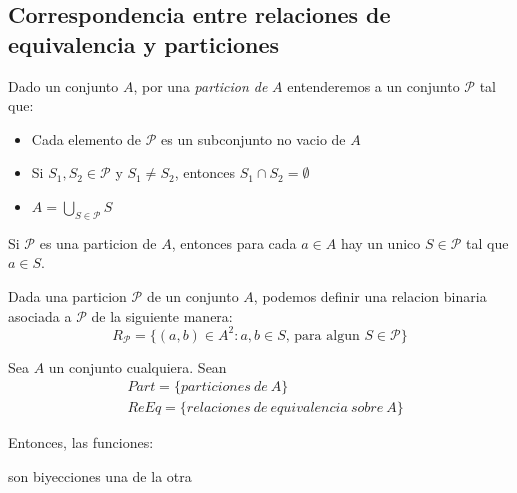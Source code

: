 \subsection{Correspondencia entre relaciones de equivalencia y particiones}
\begin{definition}
  Dado un conjunto $A$, por una \emph{particion de } $A$ entenderemos a un conjunto $\mathcal{P}$ tal que:
  \begin{itemize}
    \item Cada elemento de $\mathcal{P}$ es un subconjunto no vacio de $A$
    \item Si $S_1, S_2 \in \mathcal{P}$ y $S_1 \neq S_2$, entonces $S_1 \cap S_2 = \emptyset$
    \item $A = \bigcup_{S \in \mathcal{P}}S$
  \end{itemize}
\end{definition}
\begin{remark}
  Si $\mathcal{P}$ es una particion de $A$, entonces para cada $a \in A$ hay un unico $S \in \mathcal{P}$
  tal que $a \in S$.
\end{remark}
\begin{definition}
  Dada una particion $\mathcal{P}$ de un conjunto $A$, podemos definir una relacion binaria
  asociada a $\mathcal{P}$ de la siguiente manera:
  $$
  R_\mathcal{P} = \{(a, b) \in A^2 : a, b \in S\text{, para algun }S \in \mathcal{P}\}
  $$
\end{definition}

\begin{theorem}
  Sea $A$ un conjunto cualquiera. Sean
  \begin{equation*}\begin{split}
      &Part = \{particiones\ de\ A\}\\
      &ReEq = \{relaciones\ de\ equivalencia\ sobre\ A\}
  \end{split}\end{equation*}
  
  Entonces, las funciones:

  son biyecciones una de la otra
\end{theorem}

\noproof
